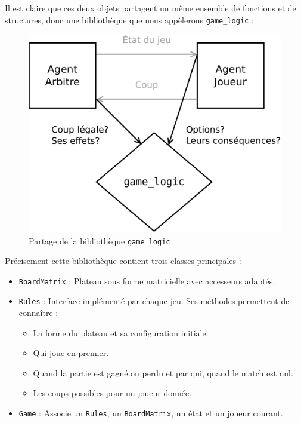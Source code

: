 Il est claire que ces deux objets partagent un même ensemble de fonctions et de structures, donc une bibliothèque que nous appèlerons \texttt{game\_logic}  :
\begin{figure}[H] 
\centering
\includegraphics[width=\textwidth]{files/env/game_logic_shared} 
\caption{Partage de la bibliothèque \texttt{game\_logic}} 
\label{game_logic_shared}
\end{figure}
Précisement cette bibliothèque contient trois classes principales :
\begin{itemize}
\item \texttt{BoardMatrix} : Plateau sous forme matricielle avec accesseurs adaptés.
\item \texttt{Rules} : Interface implémenté par chaque jeu. Ses méthodes permettent de connaître :
\begin{itemize}
\item La forme du plateau et sa configuration initiale.
\item Qui joue en premier.
\item Quand la partie est gagné ou perdu et par qui, quand le match est nul.
\item Les coups possibles pour un joueur donnée.
\end{itemize}
\item \texttt{Game} : Associe un \texttt{Rules}, un \texttt{BoardMatrix}, un état et un joueur courant.
\end{itemize}
